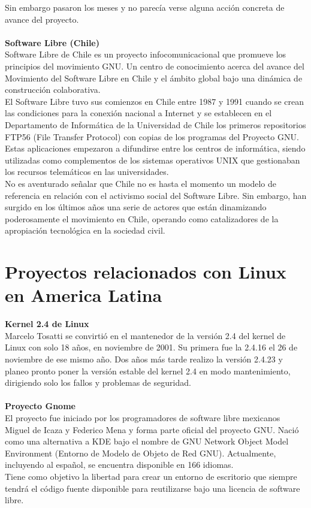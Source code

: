 Sin embargo pasaron los meses y no parecía verse alguna acción concreta de avance del proyecto.
\\
\\
{\bf Software Libre (Chile)}
\\
Software Libre de Chile es un proyecto infocomunicacional que promueve los principios del movimiento GNU. Un centro de conocimiento acerca del avance del Movimiento del Software Libre en Chile y el ámbito global bajo una dinámica de construcción colaborativa.
\\
El Software Libre tuvo sus comienzos en Chile entre 1987 y 1991 cuando se crean las condiciones para la conexión nacional a Internet y se establecen en el Departamento de Informática de la Universidad de Chile los primeros repositorios FTP56 (File Transfer Protocol) con copias de los programas del Proyecto GNU. Estas aplicaciones empezaron a difundirse entre los centros de informática, siendo utilizadas como complementos de los sistemas operativos UNIX que gestionaban los recursos telemáticos en las universidades.
\\
No es aventurado señalar que Chile no es hasta el momento un modelo de referencia en relación con el activismo social del Software Libre. Sin embargo, han surgido en los últimos años una serie de actores que están dinamizando poderosamente el movimiento en Chile, operando como catalizadores de la apropiación tecnológica en la sociedad civil.

\section{Proyectos relacionados con Linux en America Latina}

{\bf Kernel 2.4 de Linux}
\\
Marcelo Tosatti se convirtió en el mantenedor de la versión 2.4 del kernel de Linux con solo 18 años, en noviembre de 2001. Su primera fue la 2.4.16 el 26 de noviembre de ese mismo año. Dos años más tarde realizo la versión 2.4.23 y planeo pronto poner la versión estable del kernel 2.4 en modo mantenimiento, dirigiendo solo los fallos y problemas de seguridad.
\\
\\
{\bf Proyecto Gnome}
\\
El proyecto fue iniciado por los programadores de software libre mexicanos Miguel de Icaza y Federico Mena y forma parte oficial del proyecto GNU. Nació como una alternativa a KDE bajo el nombre de GNU Network Object Model Environment (Entorno de Modelo de Objeto de Red GNU). Actualmente, incluyendo al español, se encuentra disponible en 166 idiomas.
\\
Tiene como objetivo la libertad para crear un entorno de escritorio que siempre tendrá el código fuente disponible para reutilizarse bajo una licencia de software libre.

